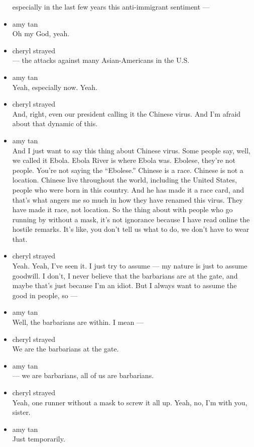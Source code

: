\begin{itemize}
  especially in the last few years this anti-immigrant sentiment ---
\item
  amy tan\\
  Oh my God, yeah.
\item
  cheryl strayed\\
  --- the attacks against many Asian-Americans in the U.S.
\item
  amy tan\\
  Yeah, especially now. Yeah.
\item
  cheryl strayed\\
  And, right, even our president calling it the Chinese virus. And I'm
  afraid about that dynamic of this.
\item
  amy tan\\
  And I just want to say this thing about Chinese virus. Some people
  say, well, we called it Ebola. Ebola River is where Ebola was.
  Ebolese, they're not people. You're not saying the ``Ebolese.''
  Chinese is a race. Chinese is not a location. Chinese live throughout
  the world, including the United States, people who were born in this
  country. And he has made it a race card, and that's what angers me so
  much in how they have renamed this virus. They have made it race, not
  location. So the thing about with people who go running by without a
  mask, it's not ignorance because I have read online the hostile
  remarks. It's like, you don't tell us what to do, we don't have to
  wear that.
\item
  cheryl strayed\\
  Yeah. Yeah, I've seen it. I just try to assume --- my nature is just
  to assume goodwill. I don't, I never believe that the barbarians are
  at the gate, and maybe that's just because I'm an idiot. But I always
  want to assume the good in people, so ---
\item
  amy tan\\
  Well, the barbarians are within. I mean ---
\item
  cheryl strayed\\
  We are the barbarians at the gate.
\item
  amy tan\\
  --- we are barbarians, all of us are barbarians.
\item
  cheryl strayed\\
  Yeah, one runner without a mask to screw it all up. Yeah, no, I'm with
  you, sister.
\item
  amy tan\\
  Just temporarily.

\end{itemize}
